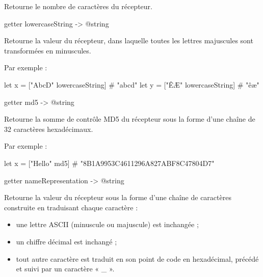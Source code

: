 Retourne le nombre de caractères du récepteur.









\begin{galgasbox}
getter lowercaseString -> @string
\end{galgasbox}

Retourne la valeur du récepteur, dans laquelle toutes les lettres majuscules sont transformées en minuscules.

Par exemple :
\begin{galgas}
let x = ["AbcD" lowercaseString] # "abcd"
let y = ["ÊÆ" lowercaseString] # "êæ"
\end{galgas}








\begin{galgasbox}
getter md5 -> @string
\end{galgasbox}

Retourne la somme de contrôle MD5 du récepteur sous la forme d'une chaîne de 32 caractères hexadécimaux.

Par exemple :
\begin{galgas}
let x = ["Hello" md5] # "8B1A9953C4611296A827ABF8C47804D7"
\end{galgas}








\begin{galgasbox}
getter nameRepresentation -> @string
\end{galgasbox}

Retourne la valeur du récepteur sous la forme d'une chaîne de caractères construite en traduisant chaque caractère :
\begin{itemize}
\item une lettre ASCII (minuscule ou majuscule) est inchangée ;
\item un chiffre décimal est inchangé ;
\item tout autre caractère est traduit en son point de code en hexadécimal, précédé et suivi par un caractère « \_ ».
\end{itemize}

